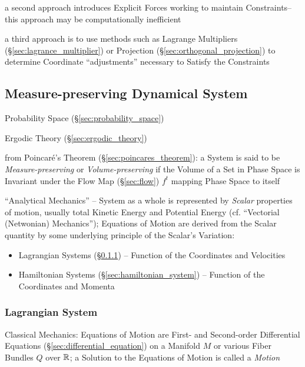 a second approach introduces Explicit Forces working to maintain Constraints--
this approach may be computationally inefficient

a third approach is to use methods such as Lagrange Multipliers
(\S\ref{sec:lagrance_multiplier}) or Projection
(\S\ref{sec:orthogonal_projection}) to determine Coordinate ``adjustments''
necessary to Satisfy the Constraints



\subsection{Measure-preserving Dynamical System}
\label{sec:measure_preserving_system}

Probability Space (\S\ref{sec:probability_space})

\fist Ergodic Theory (\S\ref{sec:ergodic_theory})

from Poincar\'e's Theorem (\S\ref{sec:poincares_theorem}): a System is said to
be \emph{Measure-preserving} or \emph{Volume-preserving} if the Volume of a Set
in Phase Space is Invariant under the Flow Map (\S\ref{sec:flow}) $f^t$ mapping
Phase Space to itself

``Analytical Mechanics'' -- System as a whole is represented by \emph{Scalar}
properties of motion, usually total Kinetic Energy and Potential Energy (cf.
``Vectorial (Netwonian) Mechanics''); Equations of Motion are derived from the
Scalar quantity by some underlying principle of the Scalar's Variation:
\begin{itemize}
  \item Lagrangian Systems (\S\ref{sec:lagrangian_system}) -- Function of the
    Coordinates and Velocities
  \item Hamiltonian Systems (\S\ref{sec:hamiltonian_system}) -- Function of the
    Coordinates and Momenta
\end{itemize}



\subsubsection{Lagrangian System}\label{sec:lagrangian_system}

Classical Mechanics: Equations of Motion are First- and Second-order
Differential Equations (\S\ref{sec:differential_equation}) on a Manifold $M$ or
various Fiber Bundles $Q$ over $\mathbb{R}$; a Solution to the Equations of Motion
is called a \emph{Motion}

